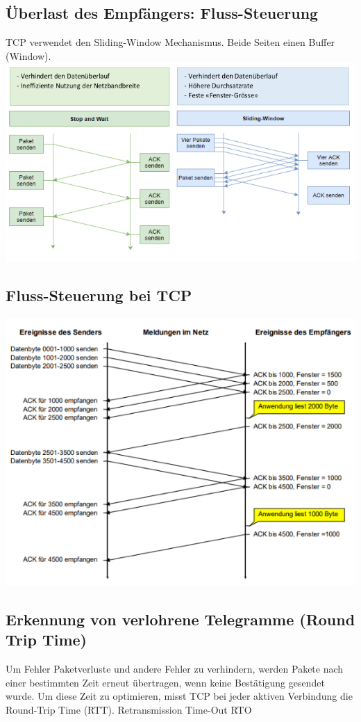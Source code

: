 \vfill\null
\columnbreak
\subsection{Überlast des Empfängers: Fluss-Steuerung}
{TCP verwendet den Sliding-Window Mechanismus. Beide Seiten einen Buffer (Window).}
\includegraphics[scale=.375]{img/ueberlast.png}
\subsection{Fluss-Steuerung bei TCP}
{
    \includegraphics[scale=.45]{img/tcp-flow.png}}

\subsection{Erkennung von verlohrene Telegramme (Round Trip Time)}
{Um Fehler Paketverluste und andere Fehler zu verhindern, werden Pakete nach einer bestimmten Zeit erneut übertragen, wenn keine Bestätigung gesendet wurde.
    Um diese Zeit zu optimieren, misst TCP bei jeder aktiven Verbindung die Round-Trip Time (RTT).}
Retransmission Time-Out RTO